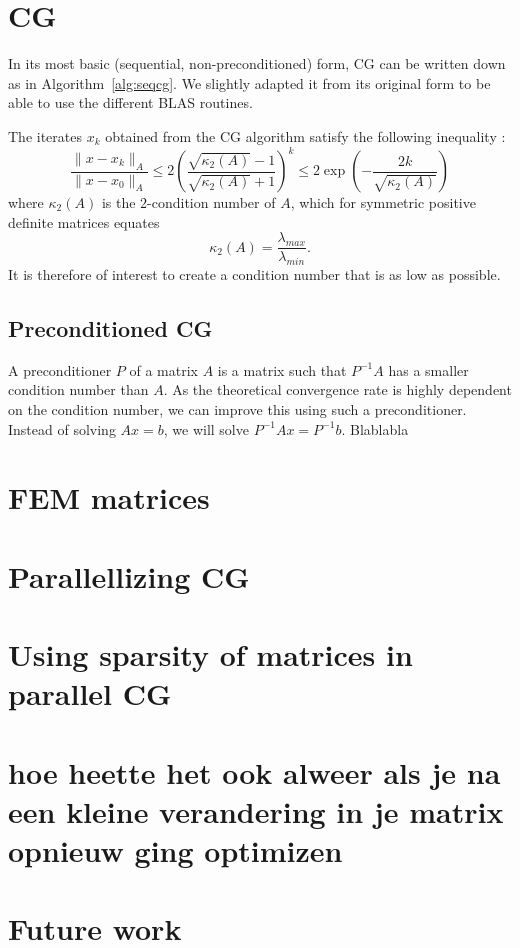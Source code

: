 \documentclass[11pt]{amsart}
\theoremstyle{definition}
\begin{document}
\section{CG}
In its most basic (sequential, non-preconditioned) form, CG can be written down as in Algorithm~\ref{alg:seqcg}. \cite[Alg.~4.8]{biss04} We slightly adapted it from its original form to be able to use the different BLAS routines.

The iterates $x_k$ obtained from the CG algorithm satisfy the following inequality \cite[Slide 23]{sleij}:
\[
  \frac{\|x - x_k\|_A}{\|x - x_0\|_A} \leq 2 \left( \frac{ \sqrt{\kappa_2(A)}-1}{\sqrt{\kappa_2(A)}+1}\right)^k \leq 2 \exp \left( -\frac{2k}{\sqrt{\kappa_2(A)}}\right) 
\]
where $\kappa_2(A)$ is the $2$-condition number of $A$, which for symmetric positive definite matrices equates
\[
  \kappa_2(A) = \frac{\lambda_{max}}{\lambda_{min}}.
\]
It is therefore of interest to create a condition number that is as low as possible.

\subsection{Preconditioned CG}
A preconditioner $P$ of a matrix $A$ is a matrix such that $P^{-1}A$ has a smaller condition number than $A$. As the theoretical convergence rate is highly dependent on the condition number, we can improve this using such a preconditioner. Instead of solving $Ax = b$, we will solve $P^{-1}Ax = P^{-1}b$. Blablabla

\section{FEM matrices}
\section{Parallellizing CG}

\section{Using sparsity of matrices in parallel CG}

\section{hoe heette het ook alweer als je na een kleine verandering in je matrix opnieuw ging optimizen}

\section{Future work}
\end{document}
